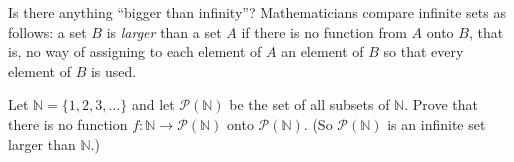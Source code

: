 Is there anything ``bigger than infinity''? Mathematicians compare infinite sets as follows: a set $B$ is \emph{larger} than a set $A$ if there is no function from $A$ onto $B$, that is, no way of assigning to each element of $A$ an element of $B$ so that every element of $B$ is used.

Let $\mathbb{N}=\{1,2,3,\dots\}$ and let $\mathcal{P}(\mathbb{N})$ be the set of all subsets of $\mathbb{N}$. Prove that there is no function $f:\mathbb{N}\to\mathcal{P}(\mathbb{N})$ onto $\mathcal{P}(\mathbb{N})$. (So $\mathcal{P}(\mathbb{N})$ is an infinite set larger than $\mathbb{N}$.)
